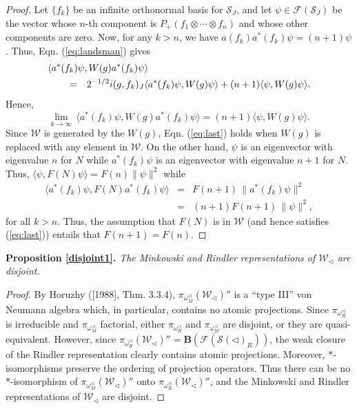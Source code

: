 \documentclass[12pt]{article}
\theoremstyle{remark}
\theoremstyle{definition}
\newcommand{\alg}[1]{\mathcal{#1}}
\newcommand{\norm}[1]{\| #1\|}
\newcommand{\hil}[1]{\mathcal{#1}}
\begin{document}
\begin{proof}
  Let $\{ f_{k}\}$ be an infinite orthonormal basis for $\hil{S}_{J}$, and let
  $\psi \in \hil{F}(\hil{S}_{J})$ be the vector whose $n$-th component is
  $P_{+}(f_{1}\otimes \cdots \otimes f_{n})$ and whose other
  components are zero.  Now, for any $k>n$, we have
  $a(f_{k})a^{*}(f_{k})\psi =(n+1)\psi$.  Thus, Eqn. (\ref{eq:landsman})
  gives \begin{eqnarray} \lefteqn{\langle a^{*}(f_{k})\psi
      ,W(g)a^{*}(f_{k})\psi \rangle }
    \qquad \nonumber \\
    &=& 2^{-1/2}i(g,f_{k})_{J}\langle a^{*}(f_{k})\psi ,W(g)\psi \rangle
    +(n+1)\langle \psi ,W(g)\psi \rangle .\end{eqnarray} Hence,
  \begin{equation}
\lim _{k\rightarrow\infty} \,\langle a^{*}(f_{k})\psi ,W(g)a^{*}(f_{k})\psi \rangle =
(n+1)\langle \psi ,W(g)\psi \rangle . \label{eq:last} \end{equation}
Since $\alg{W}$ is generated by the $W(g)$, Eqn. (\ref{eq:last}) holds when
$W(g)$ is replaced with any element in $\alg{W}$.  On the other hand, $\psi$ is an
eigenvector with eigenvalue $n$ for $N$ while $a^{*}(f_{k})\psi$ is an
eigenvector with eigenvalue $n+1$ for $N$.  Thus, $\langle \psi
,F(N)\psi \rangle =F(n)\norm{\psi}^{2}$ while
\begin{eqnarray}
\langle a^{*}(f_{k})\psi , F(N)a^{*}(f_{k})\psi \rangle &=&
F(n+1)\,\norm{a^{*}(f_{k})\psi }^{2} \\
&=& (n+1)F(n+1)\,\norm{\psi}^{2} ,\end{eqnarray}
for all $k>n$.  Thus, the assumption that $F(N)$ is in $\alg{W}$ (and 
hence satisfies (\ref{eq:last})) 
entails that $F(n+1)=F(n)$.  \end{proof}


\noindent \textbf{Proposition \ref{disjoint1}.} \emph{The Minkowski and 
Rindler representations of 
  $\alg{W}_{\triangleleft}$ are disjoint.}

\begin{proof}   

By Horuzhy ([1988], Thm. 3.3.4), 
  $\pi _{\omega _{M}^{\triangleleft}}(\alg{W}_{\triangleleft})''$ is 
  a ``type III'' von Neumann algebra which, in particular, contains no 
  atomic projections.  
   Since $\pi _{\omega _{R}^{\triangleleft}}$ is irreducible and 
  $\pi _{\omega _{M}^{\triangleleft}}$ factorial, either 
  $\pi _{\omega _{R}^{\triangleleft}}$ and $\pi _{\omega _{M}^{\triangleleft}}$ are 
  disjoint, or they are quasi-equivalent.  However, since 
  $\pi _{\omega _{R}^{\triangleleft}}(\alg{W}_{\triangleleft})''=
  \mathbf{B}(\hil{F}(\hil{S}(\triangleleft)_{R}))$, the weak closure 
  of the Rindler representation clearly contains atomic 
  projections.   Moreover, $*$-isomorphisms preserve the ordering of projection operators. 
    Thus there can be no $*$-isomorphism of 
  $\pi _{\omega _{M}^{\triangleleft}}(\alg{W}_{\triangleleft})''$ 
  onto $\pi _{\omega _{R}^{\triangleleft}}(\alg{W}_{\triangleleft})''$,  
  and the Minkowski and Rindler representations of $\alg{W}_{\triangleleft}$  
  are disjoint. \end{proof}
  
\end{document}
